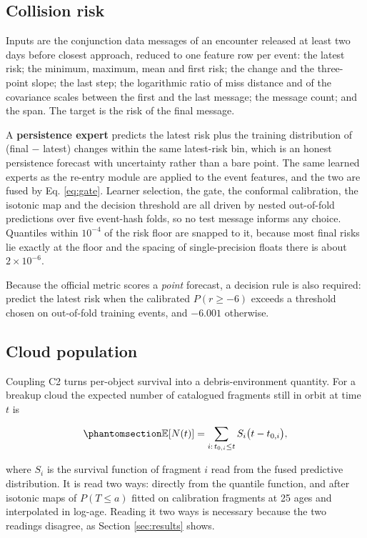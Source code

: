 \documentclass[3p,times]{elsarticle}
\begin{document}
\subsection{Collision risk}\label{collision-risk}

Inputs are the conjunction data messages of an encounter released at
least two days before closest approach, reduced to one feature row per
event: the latest risk; the minimum, maximum, mean and first risk; the
change and the three-point slope; the last step; the logarithmic ratio
of miss distance and of the covariance scales between the first and the
last message; the message count; and the span. The target is the risk of
the final message.

A \textbf{persistence expert} predicts the latest risk plus the training
distribution of (final \(-\) latest) changes within the same latest-risk
bin, which is an honest persistence forecast with uncertainty rather
than a bare point. The same learned experts as the re-entry module are
applied to the event features, and the two are fused by Eq.
\ref{eq:gate}. Learner selection, the gate, the conformal calibration,
the isotonic map and the decision threshold are all driven by nested
out-of-fold predictions over five event-hash folds, so no test message
informs any choice. Quantiles within \(10^{-4}\) of the risk floor are
snapped to it, because most final risks lie exactly at the floor and the
spacing of single-precision floats there is about \(2 \times 10^{-6}\).

Because the official metric scores a \emph{point} forecast, a decision
rule is also required: predict the latest risk when the calibrated
\(P(r \geq -6)\) exceeds a threshold chosen on out-of-fold training
events, and \(-6.001\) otherwise.

\subsection{Cloud population}\label{cloud-population}

Coupling C2 turns per-object survival into a debris-environment
quantity. For a breakup cloud the expected number of catalogued
fragments still in orbit at time \(t\) is

\begin{equation}\protect\phantomsection\label{eq:cloud}{\mathbb{E}[N(t)] = \sum_{i:\, t_{0,i} \leq t} S_i\bigl(t - t_{0,i}\bigr),}\end{equation}

where \(S_i\) is the survival function of fragment \(i\) read from the
fused predictive distribution. It is read two ways: directly from the
quantile function, and after isotonic maps of \(P(T \leq a)\) fitted on
calibration fragments at 25 ages and interpolated in log-age. Reading it
two ways is necessary because the two readings disagree, as Section
\ref{sec:results} shows.
\end{document}
